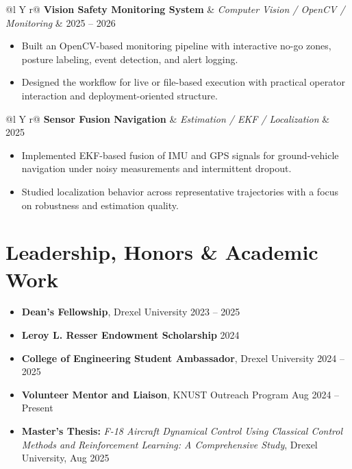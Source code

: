 \documentclass[10pt,letterpaper]{article}
\makeatletter
\newenvironment{project}[3]
{
\begin{tabularx}{\textwidth}{@{}l Y r@{}}
\textbf{#1} & \textit{#2} & #3
\end{tabularx}
\vspace{-0.45em}
\begin{itemize}[leftmargin=1.2em, itemsep=0.18em, topsep=0.2em]
}
{
\end{itemize}
\vspace{0.15em}
}
\makeatother
\begin{document}
\begin{project}
{Vision Safety Monitoring System}
{Computer Vision / OpenCV / Monitoring}
{2025 -- 2026}
    \item Built an OpenCV-based monitoring pipeline with interactive no-go zones, posture labeling, event detection, and alert logging.
    \item Designed the workflow for live or file-based execution with practical operator interaction and deployment-oriented structure.
\end{project}

\begin{project}
{Sensor Fusion Navigation}
{Estimation / EKF / Localization}
{2025}
    \item Implemented EKF-based fusion of IMU and GPS signals for ground-vehicle navigation under noisy measurements and intermittent dropout.
    \item Studied localization behavior across representative trajectories with a focus on robustness and estimation quality.
\end{project}

\section{Leadership, Honors \& Academic Work}

\begin{itemize}[leftmargin=1.2em, itemsep=0.18em, topsep=0.2em]
    \item \textbf{Dean's Fellowship}, Drexel University \hfill 2023 -- 2025
    \item \textbf{Leroy L. Resser Endowment Scholarship} \hfill 2024
    \item \textbf{College of Engineering Student Ambassador}, Drexel University \hfill 2024 -- 2025
    \item \textbf{Volunteer Mentor and Liaison}, KNUST Outreach Program \hfill Aug 2024 -- Present
    \item \textbf{Master's Thesis:} \textit{F-18 Aircraft Dynamical Control Using Classical Control Methods and Reinforcement Learning: A Comprehensive Study}, Drexel University, Aug 2025
\end{itemize}
\end{document}
